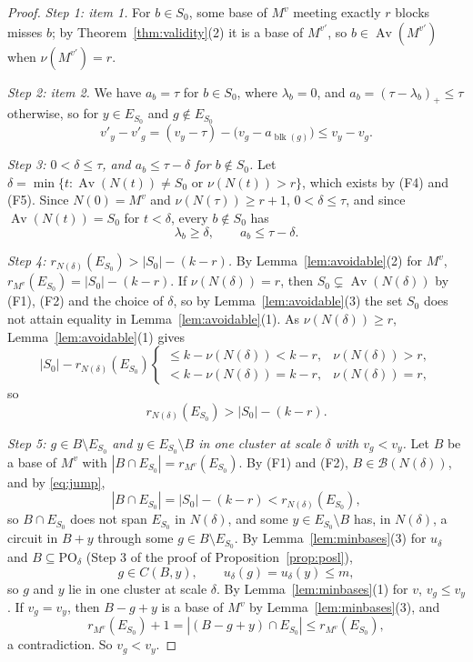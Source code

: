 \documentclass[11pt]{article}
\newcommand{\blk}{\operatorname{blk}}
\newcommand{\PO}{\mathrm{PO}}
\newcommand{\Bases}{\mathcal B}
\newcommand{\Av}{\operatorname{Av}}
\begin{document}
\begin{proof}
\emph{Step 1: item 1.}  For $b\in S_0$, some base of $M^{v}$ meeting exactly $r$
blocks misses $b$; by Theorem~\ref{thm:validity}(2) it is a base of $M^{v'}$, so
$b\in\Av(M^{v'})$ when $\nu(M^{v'})=r$.

\emph{Step 2: item 2.}  We have $a_b=\tau$ for $b\in S_0$, where $\lambda_b=0$,
and $a_b=(\tau-\lambda_b)_+\le\tau$ otherwise, so for $y\in E_{S_0}$ and
$g\notin E_{S_0}$
\[
  v'_y-v'_g=(v_y-\tau)-\bigl(v_g-a_{\blk(g)}\bigr)\le v_y-v_g.
\]

\emph{Step 3: $0<\delta\le\tau$, and $a_b\le\tau-\delta$ for $b\notin S_0$.}  Let
$\delta=\min\{t:\Av(N(t))\ne S_0\text{ or }\nu(N(t))>r\}$, which exists by (F4)
and (F5).  Since $N(0)=M^{v}$ and $\nu(N(\tau))\ge r+1$, $0<\delta\le\tau$, and
since $\Av(N(t))=S_0$ for $t<\delta$, every $b\notin S_0$ has
\[
  \lambda_b\ge\delta,\qquad a_b\le\tau-\delta.
\]

\emph{Step 4: $r_{N(\delta)}(E_{S_0})>|S_0|-(k-r)$.}  By Lemma~\ref{lem:avoidable}(2) for $M^{v}$,
$r_{M^{v}}(E_{S_0})=|S_0|-(k-r)$.  If $\nu(N(\delta))=r$, then
$S_0\subsetneq\Av(N(\delta))$ by (F1), (F2) and the choice of $\delta$, so by
Lemma~\ref{lem:avoidable}(3) the set $S_0$ does not attain equality in
Lemma~\ref{lem:avoidable}(1).  As $\nu(N(\delta))\ge r$, Lemma~\ref{lem:avoidable}(1)
gives
\[
  |S_0|-r_{N(\delta)}(E_{S_0})
  \begin{cases}
    \le k-\nu(N(\delta))<k-r,&\nu(N(\delta))>r,\\
    <k-\nu(N(\delta))=k-r,&\nu(N(\delta))=r,
  \end{cases}
\]
so
\begin{equation}
  r_{N(\delta)}(E_{S_0})>|S_0|-(k-r).
  \label{eq:jump}
\end{equation}

\emph{Step 5: $g\in B\setminus E_{S_0}$ and $y\in E_{S_0}\setminus B$ in one cluster at scale $\delta$ with $v_g<v_y$.}  Let $B$ be a base of $M^{v}$ with
$|B\cap E_{S_0}|=r_{M^{v}}(E_{S_0})$.  By (F1) and (F2), $B\in\Bases(N(\delta))$, and
by \eqref{eq:jump},
\[
  |B\cap E_{S_0}|=|S_0|-(k-r)<r_{N(\delta)}(E_{S_0}),
\]
so $B\cap E_{S_0}$ does not span $E_{S_0}$ in $N(\delta)$, and some
$y\in E_{S_0}\setminus B$ has, in $N(\delta)$, a circuit in $B+y$ through some
$g\in B\setminus E_{S_0}$.  By Lemma~\ref{lem:minbases}(3) for $u_\delta$ and
$B\subseteq\PO_\delta$ (Step 3 of the proof of Proposition~\ref{prop:posl}),
\[
  g\in C(B,y),\qquad u_\delta(g)=u_\delta(y)\le m,
\]
so $g$ and $y$ lie in one cluster at scale $\delta$.  By Lemma~\ref{lem:minbases}(1)
for $v$, $v_g\le v_y$.  If $v_g=v_y$, then $B-g+y$ is a base of $M^{v}$ by
Lemma~\ref{lem:minbases}(3), and
\[
  r_{M^{v}}(E_{S_0})+1=|(B-g+y)\cap E_{S_0}|\le r_{M^{v}}(E_{S_0}),
\]
a contradiction.  So $v_g<v_y$.


\end{proof}
\end{document}
